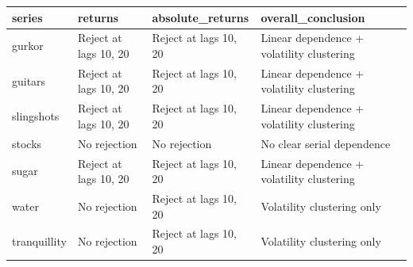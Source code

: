 \begin{tabular}{llll}
\toprule
series & returns & absolute_returns & overall_conclusion \\
\midrule
gurkor & Reject at lags 10, 20 & Reject at lags 10, 20 & Linear dependence + volatility clustering \\
guitars & Reject at lags 10, 20 & Reject at lags 10, 20 & Linear dependence + volatility clustering \\
slingshots & Reject at lags 10, 20 & Reject at lags 10, 20 & Linear dependence + volatility clustering \\
stocks & No rejection & No rejection & No clear serial dependence \\
sugar & Reject at lags 10, 20 & Reject at lags 10, 20 & Linear dependence + volatility clustering \\
water & No rejection & Reject at lags 10, 20 & Volatility clustering only \\
tranquillity & No rejection & Reject at lags 10, 20 & Volatility clustering only \\
\bottomrule
\end{tabular}
